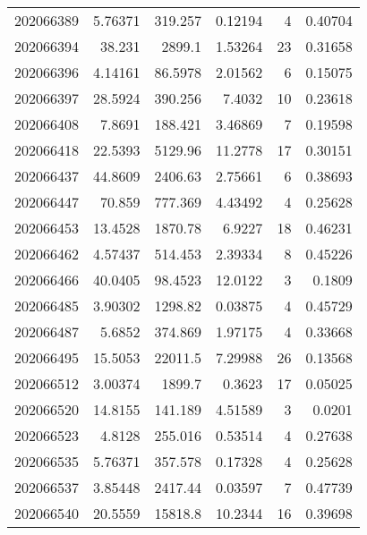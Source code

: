 \begin{tabular}{rrrrrr}
 202066389 &          5.76371 &      319.257  &            0.12194 &           4 & 0.40704 \\
 202066394 &         38.231   &     2899.1    &            1.53264 &          23 & 0.31658 \\
 202066396 &          4.14161 &       86.5978 &            2.01562 &           6 & 0.15075 \\
 202066397 &         28.5924  &      390.256  &            7.4032  &          10 & 0.23618 \\
 202066408 &          7.8691  &      188.421  &            3.46869 &           7 & 0.19598 \\
 202066418 &         22.5393  &     5129.96   &           11.2778  &          17 & 0.30151 \\
 202066437 &         44.8609  &     2406.63   &            2.75661 &           6 & 0.38693 \\
 202066447 &         70.859   &      777.369  &            4.43492 &           4 & 0.25628 \\
 202066453 &         13.4528  &     1870.78   &            6.9227  &          18 & 0.46231 \\
 202066462 &          4.57437 &      514.453  &            2.39334 &           8 & 0.45226 \\
 202066466 &         40.0405  &       98.4523 &           12.0122  &           3 & 0.1809  \\
 202066485 &          3.90302 &     1298.82   &            0.03875 &           4 & 0.45729 \\
 202066487 &          5.6852  &      374.869  &            1.97175 &           4 & 0.33668 \\
 202066495 &         15.5053  &    22011.5    &            7.29988 &          26 & 0.13568 \\
 202066512 &          3.00374 &     1899.7    &            0.3623  &          17 & 0.05025 \\
 202066520 &         14.8155  &      141.189  &            4.51589 &           3 & 0.0201  \\
 202066523 &          4.8128  &      255.016  &            0.53514 &           4 & 0.27638 \\
 202066535 &          5.76371 &      357.578  &            0.17328 &           4 & 0.25628 \\
 202066537 &          3.85448 &     2417.44   &            0.03597 &           7 & 0.47739 \\
 202066540 &         20.5559  &    15818.8    &           10.2344  &          16 & 0.39698 \\

\end{tabular}
